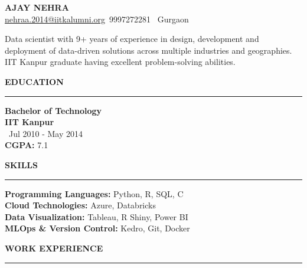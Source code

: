 \documentclass[a4paper,10pt]{article}
\begin{document}
\begin{center}
    \textbf{\LARGE \MakeUppercase{Ajay Nehra}} \\
    \vspace{1mm}
    \href{mailto:nehraa.2014@iitkalumni.org}{nehraa.2014@iitkalumni.org} \hspace{5mm} \faPhone \,9997272281 \hspace{5mm} \faMapMarker \,  Gurgaon
\end{center}

\vspace{1mm} %

Data scientist with 9+ years of experience in design, development and deployment of data-driven solutions across multiple industries and geographies. IIT Kanpur graduate having excellent problem-solving abilities.

\vspace{1mm}

\begin{multicols}{2}

\textbf{\LARGE \MakeUppercase{Education}} \\
\vspace{0mm}
\rule{\columnwidth}{0.8pt} %
\textbf{Bachelor of Technology} \\
\textbf{IIT Kanpur} \\
\faCalendar \, Jul 2010 - May 2014 \\
\textbf{CGPA:} 7.1

\columnbreak

\textbf{\LARGE \MakeUppercase{Skills}} \\
\vspace{0mm}
\rule{\columnwidth}{0.8pt} %
\textbf{Programming Languages:} Python, R, SQL, C \\
\textbf{Cloud Technologies:} Azure, Databricks \\
\textbf{Data Visualization:} Tableau, R Shiny, Power BI \\
\textbf{MLOps \& Version Control:} Kedro, Git, Docker

\end{multicols}

\vspace{1mm} %

\textbf{\LARGE \MakeUppercase{Work Experience}} \\
\vspace{1mm}
\rule{\textwidth}{0.8pt} %
\end{document}
